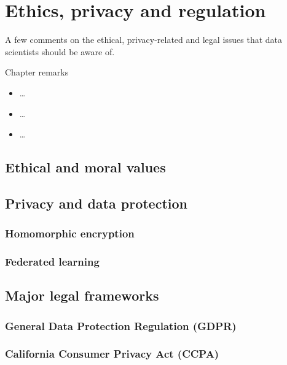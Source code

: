 \chapter{Ethics, privacy and regulation}
\label{chap:ethics}


A few comments on the ethical, privacy-related and legal issues that data scientists should be aware of.

\begin{mainbox}{Chapter remarks}


  \startcontents[chapters]
  \vspace{1em}


  \begin{itemize}
    \item \dots
  \end{itemize}


  \begin{itemize}
    \item \dots
  \end{itemize}


  \begin{itemize}
    \item \dots
  \end{itemize}
\end{mainbox}

{}
\clearpage

\section{Ethical and moral values}

\section{Privacy and data protection}

\subsection{Homomorphic encryption}

\subsection{Federated learning}

\section{Major legal frameworks}

\subsection{General Data Protection Regulation (GDPR)}

\subsection{California Consumer Privacy Act (CCPA)}
